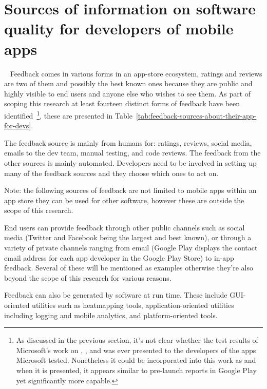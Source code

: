 \section{Sources of information on software quality for developers of mobile apps}~\label{rw-sources-of-info-on-software-quality-for-devs-of-mobile-apps}
Feedback comes in various forms in an app-store ecosystem, ratings and reviews are two of them and possibly the best known ones because they are public and highly visible to end users and anyone else who wishes to see them. As part of scoping this research at least fourteen distinct forms of feedback have been identified~\footnote{As discussed in the previous section, it's not clear whether the test results of Microsoft's work on , , and  was ever presented to the developers of the  apps Microsoft tested. Nonetheless it could be incorporated into this work as and when it is presented, it appears similar to pre-launch reports in Google Play yet significantly more capable.}, these are presented in Table~\ref{tab:feedback-sources-about-their-app-for-devs}.

The feedback source is mainly from humans for: ratings, reviews, social media, emails to the dev team, manual testing, and code reviews. The feedback from the other sources is mainly automated. Developers need to be involved in setting up many of the feedback sources and they choose which ones to act on.

Note: the following sources of feedback are not limited to mobile apps within an app store they can be used for other software, however these are outside the scope of this research.

End users can provide feedback through other public channels such as social media (Twitter and Facebook being the largest and best known), or through a variety of private channels ranging from email (Google Play displays the contact email address for each app developer in the Google Play Store) to in-app feedback. Several of these will be mentioned as examples otherwise they're also beyond the scope of this research for various reasons. 

Feedback can also be generated by software at run time. These include GUI-oriented utilities such as heatmapping tools, application-oriented utilities including logging and mobile analytics, and platform-oriented tools.


